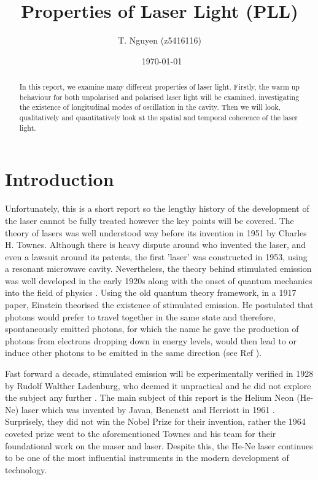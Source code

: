 \documentclass[aps,prl,reprint,10pt,amsmath,amssymb,superscriptaddress,a4paper]{revtex4-2}
\begin{document}
\title{Properties of Laser Light (PLL)}

\author{T. Nguyen (z5416116)}
\date{\currenttime~\today}

\begin{abstract}
In this report, we examine many different properties of laser light. Firstly, the warm up behaviour for both unpolarised and polarised laser light will be examined, investigating the existence of 
longitudinal modes of oscillation in the cavity. Then we will look, qualitatively and quantitatively look at the spatial and temporal coherence of the laser light.
\end{abstract}

\maketitle

\section{Introduction}

Unfortunately, this is a short report so the lengthy history of the development of the laser cannot be fully treated however the key points will be covered. The theory of lasers 
was well understood way before its invention in 1951 by Charles H. Townes. Although there is heavy dispute around who invented the laser, and even a lawsuit around its patents, the 
first 'laser' was constructed in 1953, using a resonant microwave cavity. Nevertheless, the theory behind stimulated emission was well developed in the early 1920s along with the 
onset of quantum mechanics into the field of physics \citep{hecht}. Using the old quantum theory framework, in a 1917 paper, Einstein theorised the existence of stimulated emission. 
He postulated that photons would prefer to travel together in the same state and therefore, spontaneously emitted photons, for which the name he gave the production of photons from 
electrons dropping down in energy levels, would then lead to or induce other photons to be emitted in the same direction (see Ref \citep{einstein}).

Fast forward a decade, stimulated emission will be experimentally verified in 1928 by Rudolf Walther Ladenburg, who deemed it unpractical and he did not explore the subject any further 
\citep{KopfermannLadenburg1928}. The main subject of this report is the Helium Neon (He-Ne) laser which was invented by Javan, Benenett and Herriott in 1961 \citep{Javan1961}. Surprisely, they did not win 
the Nobel Prize for their invention, rather the 1964 coveted prize went to the aforementioned Townes and his team for their foundational work on the maser and laser. Despite this, the 
He-Ne laser continues to be one of the most influential instruments in the modern development of technology.
\end{document}
